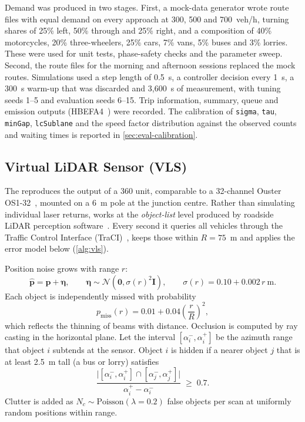 Demand was produced in two stages. First, a mock-data generator wrote route files with equal demand
on every approach at 300, 500 and 700~veh/h, turning shares of 25\% left, 50\% through and 25\% right,
and a composition of 40\% motorcycles, 20\% three-wheelers, 25\% cars, 7\% vans, 5\% buses and 3\%
lorries. These were used for unit tests, phase-safety checks and
the parameter sweep. Second, the \dtx{} route files for the morning and afternoon sessions replaced the
mock routes. Simulations used a step length of 0.5~s, a controller decision every 1~s, a 300~s
warm-up that was discarded and 3,600~s of measurement, with tuning seeds 1--5 and evaluation seeds
6--15. Trip information, summary, queue and emission outputs (HBEFA4~\cite{hbefa41}) were recorded.
The calibration of \texttt{sigma}, \texttt{tau}, \texttt{minGap}, \texttt{lcSublane} and the speed
factor distribution against the observed counts and waiting times is reported in
\cref{sec:eval-calibration}.

\subsection{Virtual LiDAR Sensor (VLS)}\label{sec:impl-vls}

The \vls{} reproduces the output of a 360\textdegree{} unit,
comparable to a 32-channel Ouster OS1-32~\cite{ouster_os1}, mounted on a 6~m pole at the junction centre. Rather than simulating individual laser returns, \vls{} works at the \emph{object-list} level produced by roadside LiDAR perception software~\cite{zhao2019lidar,lv2019lidar}. Every second it queries all vehicles
through the Traffic Control Interface (TraCI)~\cite{wegener2008traci}, keeps those within
$R = 75$~m and applies the error model below (\cref{alg:vls}).

Position noise grows with range $r$:
\begin{equation}
  \hat{\mathbf{p}} = \mathbf{p} + \boldsymbol{\eta}, \qquad
  \boldsymbol{\eta} \sim \mathcal{N}\!\left(\mathbf{0}, \sigma(r)^2\mathbf{I}\right), \qquad
  \sigma(r) = 0.10 + 0.002\,r~\text{m}.
  \label{eq:impl-noise}
\end{equation}
Each object is independently missed with probability
\begin{equation}
  p_{\text{miss}}(r) = 0.01 + 0.04\left(\frac{r}{R}\right)^{2},
  \label{eq:impl-dropout}
\end{equation}
which reflects the thinning of beams with distance. Occlusion is computed by ray casting in the
horizontal plane. Let the interval $[\alpha_i^-, \alpha_i^+]$ be the azimuth range that object $i$
subtends at the sensor. Object $i$ is hidden if a nearer object $j$ that is at least 2.5~m tall
(a bus or lorry) satisfies
\begin{equation}
  \frac{\big|[\alpha_i^-, \alpha_i^+] \cap [\alpha_j^-, \alpha_j^+]\big|}{\alpha_i^+ - \alpha_i^-} \;\geq\; 0.7 .
  \label{eq:impl-occlusion}
\end{equation}
 Clutter is
added as $N_c \sim \text{Poisson}(\lambda = 0.2)$ false objects per scan at uniformly random positions
within range.

